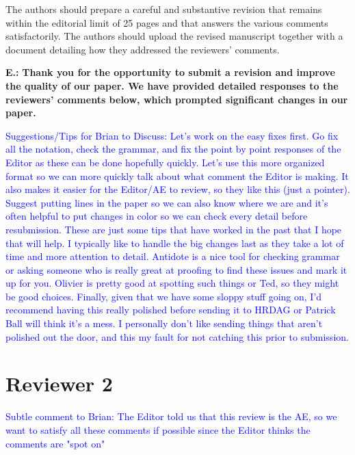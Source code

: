 \documentclass[letterpaper, parskip]{scrartcl}
\newcounter{responsectr}[section]     %
\newcommand{\reply}[2]{%
	\refstepcounter{responsectr}%
	\textbf{#1.\theresponsectr:} #2
}
\begin{document}
	The authors should prepare a careful and substantive revision that remains within the editorial limit of 25 pages and that answers the various comments satisfactorily.  The authors should upload the revised manuscript together with a document detailing how they addressed the reviewers’ comments.
	

	\reply{E}{%
		\textbf{Thank you for the opportunity to submit a revision and improve the quality of our paper. 
		We have provided detailed responses to the reviewers' comments below, 
		which prompted significant changes in our paper.}
	}
	

\textcolor{blue}{Suggestions/Tips for Brian to Discuss: Let's work on the easy fixes first. Go fix all the notation, check the grammar, and fix the point by point responses of the Editor as these can be done hopefully quickly. Let's use this more organized format so we can more quickly talk about what comment the Editor is making. It also makes it easier for the Editor/AE to review, so they like this (just a pointer). Suggest putting lines in the paper so we can also know where we are and it's often helpful to put changes in color so we can check every detail before resubmission. These are just some tips that have worked in the past that I hope that will help. I typically like to handle the big changes last as they take a lot of time and more attention to detail. Antidote is a nice tool for checking grammar or asking someone who is really great at proofing to find these issues and mark it up for you. Olivier is pretty good at spotting such things or Ted, so they might be good choices. Finally, given that we have some sloppy stuff going on, I'd recommend having this really polished before sending it to HRDAG or Patrick Ball will think it's a mess. I personally don't like sending things that aren't polished out the door, and this my fault for not catching this prior to submission.}
	
	\clearpage
	\newpage
	
	\section*{Reviewer 2}

\textcolor{blue}{Subtle comment to Brian: The Editor told us that this review is the AE, so we want to satisfy all these comments if possible since the Editor thinks the comments are "spot on"}


	\setcounter{responsectr}{0}
	
\end{document}
